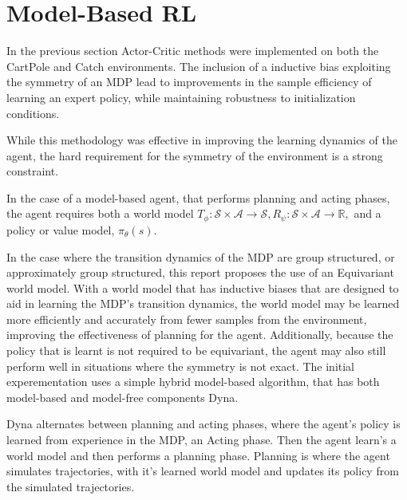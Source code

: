 \section{Model-Based RL}\label{sec:model-based}
In the previous section Actor-Critic methods were implemented on both the CartPole and Catch environments. The inclusion of a inductive bias exploiting the symmetry of an MDP lead to improvements in the sample efficiency of learning an expert policy, while maintaining robustness to initialization conditions.

While this methodology was effective in improving the learning dynamics of the agent, the hard requirement for the symmetry of the environment is a strong constraint.

In the case of a model-based agent, that performs planning and acting phases, the agent requires both a world model $T_\phi : \mathcal{S} \times \mathcal{A}\rightarrow \mathcal{S}, R_\psi :\mathcal{S} \times \mathcal{A}\rightarrow \mathbb{R}, $ and a policy or value model, $\pi_\theta(s)$.

In the case where the transition dynamics of the MDP are group structured, or approximately group structured, this report proposes the use of an Equivariant world model. With a world model that has inductive biases that are designed to aid in learning the MDP's transition dynamics, the world model may be learned more efficiently and accurately from fewer samples from the environment, improving the effectiveness of planning for the agent. Additionally, because the policy that is learnt is not required to be equivariant, the agent may also still perform well in situations where the symmetry is not exact. The initial experementation uses a simple hybrid model-based algorithm, that has both model-based and model-free components Dyna.

Dyna alternates between planning and acting phases, where the agent's policy is learned from experience in the MDP, an Acting phase. Then the agent learn's a world model and then performs a planning phase. Planning is where the agent simulates trajectories, with it's learned world model and updates its policy from the simulated trajectories.


